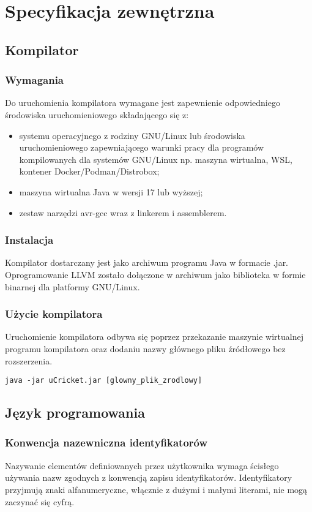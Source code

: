 \chapter{Specyfikacja zewnętrzna}
\label{ch:04}
\section{Kompilator}
\subsection{Wymagania}
Do uruchomienia kompilatora wymagane jest zapewnienie odpowiedniego środowiska uruchomieniowego składającego się z:
\begin{itemize}
\item systemu operacyjnego z rodziny GNU/Linux lub środowiska uruchomieniowego zapewniającego warunki pracy dla programów kompilowanych dla systemów GNU/Linux np. maszyna wirtualna, WSL, kontener Docker/Podman/Distrobox;
\item maszyna wirtualna Java w wersji 17 lub wyższej;
\item zestaw narzędzi avr-gcc wraz z linkerem i assemblerem.
\end{itemize}

\subsection{Instalacja}
Kompilator dostarczany jest jako archiwum programu Java w formacie .jar. Oprogramowanie LLVM zostało dołączone w archiwum jako biblioteka w formie binarnej dla platformy GNU/Linux.

\subsection{Użycie kompilatora}
Uruchomienie kompilatora odbywa się poprzez przekazanie maszynie wirtualnej programu kompilatora oraz dodaniu nazwy głównego pliku źródłowego bez rozszerzenia.
\begin{lstlisting}
java -jar uCricket.jar [glowny_plik_zrodlowy]
\end{lstlisting}

\section{Język programowania}
\subsection{Konwencja nazewniczna identyfikatorów}
Nazywanie elementów definiowanych przez użytkownika wymaga ścisłego używania nazw zgodnych z konwencją zapisu identyfikatorów. Identyfikatory przyjmują znaki alfanumeryczne, włącznie z dużymi i małymi literami, nie mogą zaczynać się cyfrą. 

